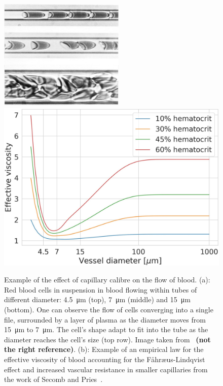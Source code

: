 \documentclass[12pt,a4paper]{journal}
\begin{document}
\begin{figure}[t]
  \centering
    \includegraphics[width=.45\textwidth, height=5.3cm]{cropped-RBC-in-capillaries.jpg}
  \hfill
    \includegraphics[width=.45\textwidth]{EffectiveViscosity-Secomb.jpeg}
  \caption{Example of the effect of capillary calibre on the flow of blood. (a): Red blood cells in suspension in blood flowing within tubes of different diameter: \SI{4.5}{\micro\meter} (top), \SI{7}{\micro\meter} (middle) and \SI{15}{\micro\meter} (bottom). One can observe the flow of cells converging into a single file, surrounded by a layer of plasma as the diameter moves from \SI{15}{\micro\meter} to \SI{7}{\micro\meter}. The cell's shape adapt to fit into the tube as the diameter reaches the cell's size (top row). Image taken from~\cite{Secomb_2013} \textbf{(not the right reference)}. (b): Example of an empirical law for the effective viscosity of blood accounting for the F\r{a}hr\ae us-Lindqvist effect and increased vascular resistance in smaller capillaries from the work of Secomb and Pries~\cite{Secomb_2013}.}
  \label{fig:effectiveViscosity}
\end{figure}
\end{document}
